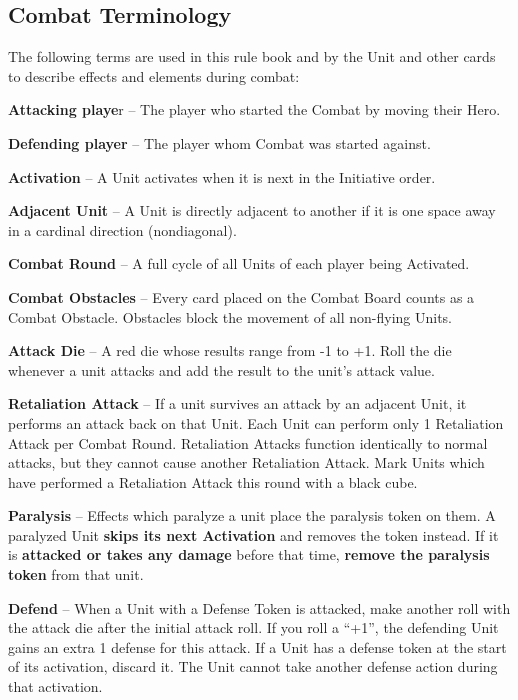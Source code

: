 \subsection*{\hypertarget{Combatterminology}{Combat Terminology}}
The following terms are used in this rule book and by the Unit and other cards to describe effects and elements during combat:\par
\textbf{Attacking playe}r – The player who started the Combat by moving their Hero.\par
\textbf{Defending player} – The player whom Combat was started against.\par
\textbf{Activation} – A Unit activates when it is next in the Initiative order.\par
\textbf{Adjacent Unit} – A Unit is directly adjacent to another if it is one space away in a cardinal direction (nondiagonal).\par
\textbf{Combat Round} – A full cycle of all Units of each player being Activated.\par
\textbf{Combat Obstacles} – Every card placed on the Combat Board counts as a Combat Obstacle.
Obstacles block the movement of all non-flying Units.\par
\textbf{Attack Die} – A red die whose results range from -1 to +1.
Roll the die whenever a unit attacks and
add the result to the unit’s attack value.\par
\textbf{\hypertarget{Retaliate}{Retaliation Attack}} – If a unit survives an attack by an adjacent Unit, it performs an attack back on that Unit.
Each Unit can perform only 1 Retaliation Attack per Combat Round.
Retaliation Attacks function identically to normal attacks, but they cannot cause another Retaliation Attack.
Mark Units which have performed a Retaliation Attack this round with a black cube.\par
\textbf{Paralysis}  – Effects which paralyze a unit place the paralysis token on them.
A paralyzed Unit \textbf{skips its next Activation} and removes the token instead.
If it is \textbf{attacked or takes any damage} before that time, \textbf{remove the paralysis token} from that unit.\par
\textbf{\hypertarget{Defend}{Defend}}  – When a Unit with a Defense Token is attacked, make another roll with the attack die
after the initial attack roll.
If you roll a “+1”, the defending Unit gains an extra 1 defense for this attack.
If a Unit has a defense token at the start of its activation, discard it.
The Unit cannot take another defense action during that activation.


